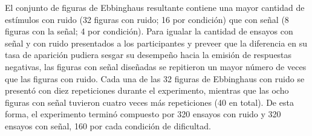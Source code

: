 \begin{itemize}
El conjunto de figuras de Ebbinghaus resultante contiene una mayor cantidad de estímulos con ruido (32 figuras con ruido; 16 por condición) que con señal (8 figuras con la señal; 4 por condición). Para igualar la cantidad de ensayos con señal y con ruido presentados a los participantes y preveer que la diferencia en su tasa de aparición pudiera sesgar su desempeño hacia la emisión de respuestas negativas, las figuras con señal diseñadas se repitieron un mayor número de veces que las figuras con ruido. Cada una de las 32 figuras de Ebbinghaus con ruido se presentó con diez repeticiones durante el experimento, mientras que las ocho figuras con señal tuvieron cuatro veces más repeticiones (40 en total). De esta forma, el experimento terminó compuesto por 320 ensayos con ruido y 320 ensayos con señal, 160 por cada condición de dificultad.\\


\end{itemize}
